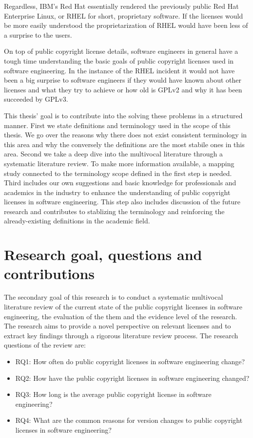 Regardless, IBM's Red Hat essentially rendered the previously public Red Hat Enterprise Linux, or RHEL for short, proprietary software. If the licenses would be more easily understood the proprietarization of RHEL would have been less of a surprise to the users.

On top of public copyright license details, software engineers in general have a tough time understanding the basic goals of public copyright licenses used in software engineering. In the instance of the RHEL incident it would not have been a big surprise to software engineers if they would have known about other licenses and what they try to achieve or how old is GPLv2 and why it has been succeeded by GPLv3.

This thesis' goal is to contribute into the solving these problems in a structured manner. First we state definitions and terminology used in the scope of this thesis. We go over the reasons why there does not exist consistent terminology in this area and why the conversely the definitions are the most stabile ones in this area. Second we take a deep dive into the multivocal literature through a systematic literature review. To make more information available, a mapping study connected to the terminology scope defined in the first step is needed. Third includes our own suggestions and basic knowledge for professionals and academics in the industry to enhance the understanding of public copyright licenses in software engineering. This step also includes discussion of the future research and contributes to stablizing the terminology and reinforcing the already-existing definitions in the academic field.

\section{Research goal, questions and contributions}
The secondary goal of this research is to conduct a systematic multivocal literature review of the current state of the public copyright licenses in software engineering, the evaluation of the them and the evidence level of the research. The research aims to provide a novel perspective on relevant licenses and to extract key findings through a rigorous literature review process. The research questions of the review are:
\begin{itemize}
	\item RQ1: How often do public copyright licenses in software engineering change?
	\item RQ2: How have the public copyright licenses in software engineering changed?
	\item RQ3: How long is the average public copyright license in software engineering?
	\item RQ4: What are the common reasons for version changes to public copyright licenses in software engineering?
\end{itemize}


